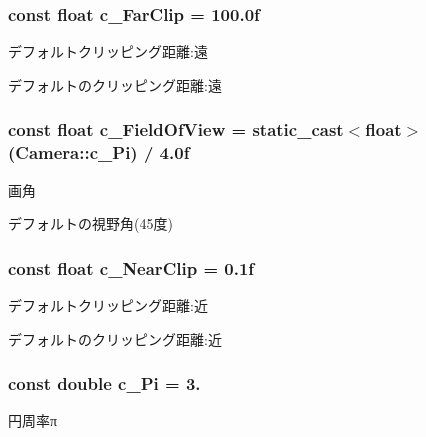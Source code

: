 \subsubsection[{\texorpdfstring{c\+\_\+\+Far\+Clip}{c_FarClip}}]{\setlength{\rightskip}{0pt plus 5cm}const float c\+\_\+\+Far\+Clip = 100.\+0f\hspace{0.3cm}{\ttfamily [static]}}\hypertarget{class_camera_aa5db6879f82c2538b7bfa2ae6b9e5656}{}\label{class_camera_aa5db6879f82c2538b7bfa2ae6b9e5656}
デフォルトクリッピング距離\+:遠

デフォルトのクリッピング距離\+:遠 
\subsubsection[{\texorpdfstring{c\+\_\+\+Field\+Of\+View}{c_FieldOfView}}]{\setlength{\rightskip}{0pt plus 5cm}const float c\+\_\+\+Field\+Of\+View = static\+\_\+cast$<$float$>$({\bf Camera\+::c\+\_\+\+Pi}) / 4.\+0f\hspace{0.3cm}{\ttfamily [static]}}\hypertarget{class_camera_a51712c894e0df64215aae12dc97985d3}{}\label{class_camera_a51712c894e0df64215aae12dc97985d3}
画角

デフォルトの視野角(45度) 
\subsubsection[{\texorpdfstring{c\+\_\+\+Near\+Clip}{c_NearClip}}]{\setlength{\rightskip}{0pt plus 5cm}const float c\+\_\+\+Near\+Clip = 0.\+1f\hspace{0.3cm}{\ttfamily [static]}}\hypertarget{class_camera_aa6af11ef8a84601a16811a8ef6d60fb1}{}\label{class_camera_aa6af11ef8a84601a16811a8ef6d60fb1}
デフォルトクリッピング距離\+:近

デフォルトのクリッピング距離\+:近 
\subsubsection[{\texorpdfstring{c\+\_\+\+Pi}{c_Pi}}]{\setlength{\rightskip}{0pt plus 5cm}const double c\+\_\+\+Pi = 3.\hspace{0.3cm}{\ttfamily [static]}}\hypertarget{class_camera_a54764981cc23a98b371bc5fc12d4e50e}{}\label{class_camera_a54764981cc23a98b371bc5fc12d4e50e}
円周率π

